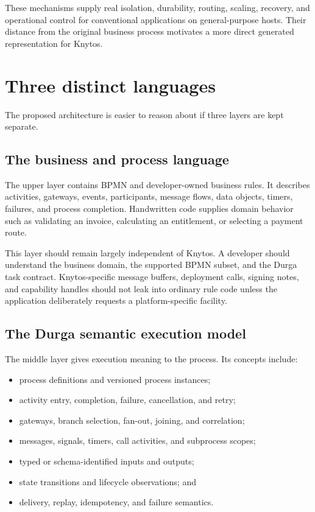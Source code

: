 These mechanisms supply real isolation, durability, routing, scaling, recovery,
and operational control for conventional applications on general-purpose
hosts. Their distance from the original business process motivates a more
direct generated representation for Knytos.

\section{Three distinct languages}

The proposed architecture is easier to reason about if three layers are kept
separate.

\subsection{The business and process language}

The upper layer contains BPMN and developer-owned business rules. It describes
activities, gateways, events, participants, message flows, data objects, timers,
failures, and process completion. Handwritten code supplies domain behavior
such as validating an invoice, calculating an entitlement, or selecting a
payment route.

This layer should remain largely independent of Knytos. A developer should
understand the business domain, the supported BPMN subset, and the Durga task
contract. Knytos-specific message buffers, deployment calls, signing notes,
and capability handles should not leak into ordinary rule code unless the
application deliberately requests a platform-specific facility.

\subsection{The Durga semantic execution model}

The middle layer gives execution meaning to the process. Its concepts include:

\begin{itemize}
    \item process definitions and versioned process instances;
    \item activity entry, completion, failure, cancellation, and retry;
    \item gateways, branch selection, fan-out, joining, and correlation;
    \item messages, signals, timers, call activities, and subprocess scopes;
    \item typed or schema-identified inputs and outputs;
    \item state transitions and lifecycle observations; and
    \item delivery, replay, idempotency, and failure semantics.
\end{itemize}

